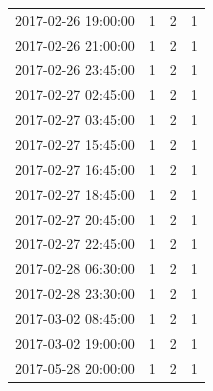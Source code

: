 \begin{tabular}{lrrr}
2017-02-26 19:00:00 & 1 & 2 & 1 \\
2017-02-26 21:00:00 & 1 & 2 & 1 \\
2017-02-26 23:45:00 & 1 & 2 & 1 \\
2017-02-27 02:45:00 & 1 & 2 & 1 \\
2017-02-27 03:45:00 & 1 & 2 & 1 \\
2017-02-27 15:45:00 & 1 & 2 & 1 \\
2017-02-27 16:45:00 & 1 & 2 & 1 \\
2017-02-27 18:45:00 & 1 & 2 & 1 \\
2017-02-27 20:45:00 & 1 & 2 & 1 \\
2017-02-27 22:45:00 & 1 & 2 & 1 \\
2017-02-28 06:30:00 & 1 & 2 & 1 \\
2017-02-28 23:30:00 & 1 & 2 & 1 \\
2017-03-02 08:45:00 & 1 & 2 & 1 \\
2017-03-02 19:00:00 & 1 & 2 & 1 \\
2017-05-28 20:00:00 & 1 & 2 & 1 \\
\bottomrule
\end{tabular}
